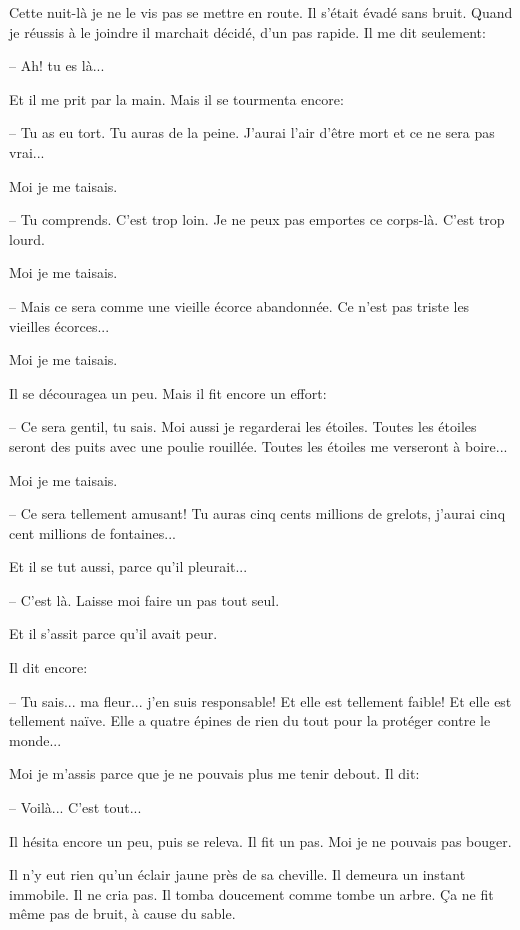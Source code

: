 \documentclass[a4paper]{report}
\begin{document}
Cette nuit-là je ne le vis pas se mettre en route. Il s'était évadé sans bruit. Quand je réussis à le joindre il marchait décidé, d'un pas rapide. Il me dit seulement:

-- Ah! tu es là...

Et il me prit par la main. Mais il se tourmenta encore:

-- Tu as eu tort. Tu auras de la peine. J'aurai l'air d'être mort et ce ne sera pas vrai...

Moi je me taisais.

-- Tu comprends. C'est trop loin. Je ne peux pas emportes ce corps-là. C'est trop lourd.

Moi je me taisais.

-- Mais ce sera comme une vieille écorce abandonnée. Ce n'est pas triste les vieilles écorces...

Moi je me taisais.

Il se découragea un peu. Mais il fit encore un effort:

-- Ce sera gentil, tu sais. Moi aussi je regarderai les étoiles. Toutes les étoiles seront des puits avec une poulie rouillée. Toutes les étoiles me verseront à boire...

Moi je me taisais.

-- Ce sera tellement amusant! Tu auras cinq cents millions de grelots, j'aurai cinq cent millions de fontaines...

Et il se tut aussi, parce qu'il pleurait...

-- C'est là. Laisse moi faire un pas tout seul.

Et il s'assit parce qu'il avait peur. 


Il dit encore:

-- Tu sais... ma fleur... j'en suis responsable! Et elle est tellement faible! Et elle est tellement naïve. Elle a quatre épines de rien du tout pour la protéger contre le monde... 


Moi je m'assis parce que je ne pouvais plus me tenir debout. Il dit:

-- Voilà... C'est tout...

Il hésita encore un peu, puis se releva. Il fit un pas. Moi je ne pouvais pas bouger.

Il n'y eut rien qu'un éclair jaune près de sa cheville. Il demeura un instant immobile. Il ne cria pas. Il tomba doucement comme tombe un arbre. Ça ne fit même pas de bruit, à cause du sable. 
\end{document}
